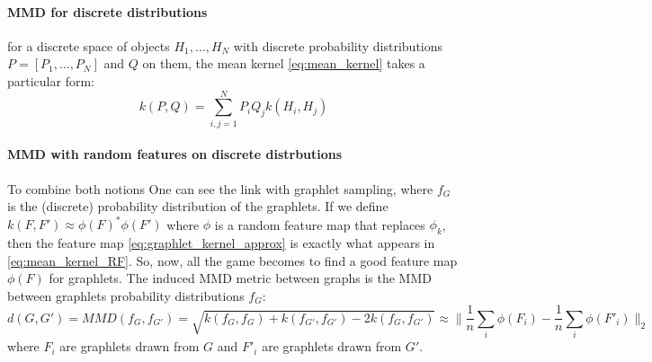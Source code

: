 \paragraph{MMD for discrete distributions}
for a discrete space of objects $H_1, \ldots, H_N$ with discrete probability distributions $P = [P_1, \ldots, P_N]$ and $Q$ on them, the mean kernel \ref{eq:mean_kernel} takes a particular form:
\[
k(P,Q) = \sum_{i,j=1}^N P_i Q_j k(H_i, H_j)
\]

\paragraph{MMD with random features on discrete distrbutions}

To combine both notions One can see the link with graphlet sampling, where $f_G$ is the (discrete) probability distribution of the graphlets. If we define $k(F, F') \approx \phi(F)^*\phi(F')$ where $\phi$ is a random feature map that replaces $\phi_k$, then the feature map \eqref{eq:graphlet_kernel_approx} is exactly what appears in \eqref{eq:mean_kernel_RF}. So, now, all the game becomes to find a good feature map $\phi(F)$ for graphlets. The induced MMD metric between graphs is the MMD between graphlets probability distributions $f_G$:
\[
d(G,G') = MMD(f_G, f_{G'}) = \sqrt{k(f_G, f_{G}) + k(f_{G'}, f_{G'}) - 2 k(f_G, f_{G'})} \approx \| \frac{1}{n} \sum_i \phi(F_i) - \frac{1}{n} \sum_i \phi(F'_i)\|_2
\]
where $F_i$ are graphlets drawn from $G$ and $F'_i$ are graphlets drawn from $G'$.






